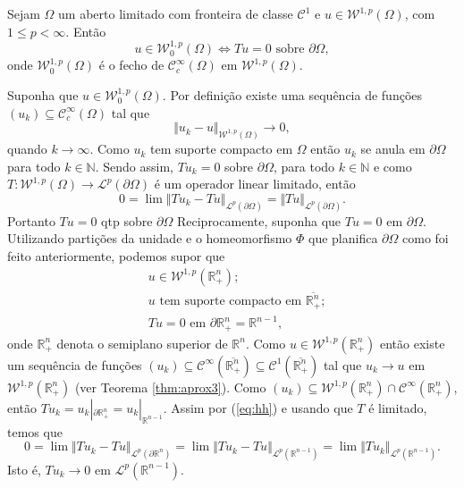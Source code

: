 \documentclass[a4paper, 11pt]{book}
\theoremstyle{definition}
\newcommand{\bN}{\mathbb{N}}
\newcommand{\bR}{\mathbb{R}}
\newcommand{\cC}{\mathcal{C}}
\newcommand{\cL}{\mathcal{L}}
\newcommand{\cW}{\mathcal{W}}
\begin{document}
\begin{tbox}[Funções traço zero em $\cW^{1,p}$] \label{thm:traco-2}
    Sejam $\Omega$ um aberto limitado com fronteira de classe $\cC^1$ e $u \in \cW^{1,p}(\Omega)$, com $1 \leqslant p < \infty$. Então
    \[
        u \in \cW_0^{1,p}(\Omega) \iff Tu = 0 \text{ sobre } \partial \Omega,
    \]
    onde $\cW_0^{1,p}(\Omega)$ é o fecho de $\cC^{\infty}_c(\Omega)$ em $\cW^{1,p}(\Omega)$.
\end{tbox}
\begin{prf}
    Suponha que $u \in \cW_0^{1,p}(\Omega)$. Por definição existe uma sequência de funções $(u_k) \subseteq \cC^{\infty}_c(\Omega)$ tal que
    \[
        \Vert u_k - u \Vert_{\cW^{1,p}(\Omega)} \to 0,
    \]
    quando $k \to \infty$. Como $u_k$ tem suporte compacto em $\Omega$ então $u_k$ se anula em $\partial \Omega$ para todo $k \in \bN$. Sendo assim, $Tu_k = 0$ sobre $\partial\Omega$, para todo $k \in \bN$ e como $T : \cW^{1,p}(\Omega) \to \cL^p(\partial \Omega)$ é um operador linear limitado, então
    \[
        0 = \lim \Vert Tu_k - Tu \Vert_{\cL^p(\partial \Omega)} = \Vert Tu \Vert_{\cL^p(\partial \Omega)}.
    \]
    Portanto $Tu =0$ qtp sobre $\partial \Omega$
    Reciprocamente, suponha que $Tu = 0$ em $\partial \Omega$. Utilizando partições da unidade e o homeomorfismo $\Phi$ que planifica $\partial \Omega$ como foi feito anteriormente, podemos supor que
    \begin{equation} \label{eq:hh}
        \begin{aligned}
            &u \in \cW^{1,p}(\bR^n_+);\\
            &u \text{ tem suporte compacto em } \overline{\bR^n_+};\\
            &Tu = 0 \text{ em } \partial \bR^n_+ = \bR^{n-1},
        \end{aligned}
    \end{equation}
    onde $\bR^n_+$ denota o semiplano superior de $\bR^n$.
    Como $u \in \cW^{1,p}(\bR^n_+)$ então existe um sequência de funções $(u_k) \subseteq \cC^{\infty}(\overline{\bR^n_+}) \subseteq \cC^1(\overline{\bR^n_+})$ tal que $u_k \to u$ em $\cW^{1,p}(\bR^n_+)$ (ver Teorema \ref{thm:aprox3}). Como $(u_k) \subseteq \cW^{1,p}(\bR^n_+) \cap \cC^\infty(\bR^n_+)$, então $T u_k = u_k |_{\partial \bR^n_+} = u_k |_{\bR^{n-1}}$.
    Assim por (\ref{eq:hh}) e usando que $T$ é limitado, temos que
    \[
        0 = \lim \Vert Tu_k - Tu \Vert_{\cL^p(\partial \bR^n)} = \lim \Vert Tu_k - Tu \Vert_{\cL^p(\bR^{n-1})} = \lim \Vert Tu_k \Vert_{\cL^p(\bR^{n-1})}.
    \]
    Isto é, $T u_k \to 0$ em $\cL^p(\bR^{n-1})$.


\end{prf}
\end{document}
